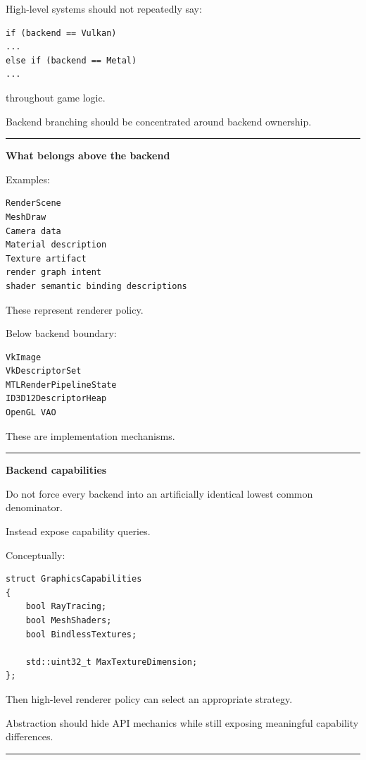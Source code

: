 High-level systems should not repeatedly say:

\begin{verbatim}
if (backend == Vulkan)
...
else if (backend == Metal)
...
\end{verbatim}

throughout game logic.

Backend branching should be concentrated around backend ownership.

\begin{center}\rule{0.5\linewidth}{0.5pt}\end{center}

\textbf{What belongs above the backend}

Examples:

\begin{verbatim}
RenderScene
MeshDraw
Camera data
Material description
Texture artifact
render graph intent
shader semantic binding descriptions
\end{verbatim}

These represent renderer policy.

Below backend boundary:

\begin{verbatim}
VkImage
VkDescriptorSet
MTLRenderPipelineState
ID3D12DescriptorHeap
OpenGL VAO
\end{verbatim}

These are implementation mechanisms.

\begin{center}\rule{0.5\linewidth}{0.5pt}\end{center}

\textbf{Backend capabilities}

Do not force every backend into an artificially identical lowest common denominator.

Instead expose capability queries.

Conceptually:

\begin{verbatim}
struct GraphicsCapabilities
{
    bool RayTracing;
    bool MeshShaders;
    bool BindlessTextures;

    std::uint32_t MaxTextureDimension;
};
\end{verbatim}

Then high-level renderer policy can select an appropriate strategy.

Abstraction should hide API mechanics while still exposing meaningful capability differences.

\begin{center}\rule{0.5\linewidth}{0.5pt}\end{center}

